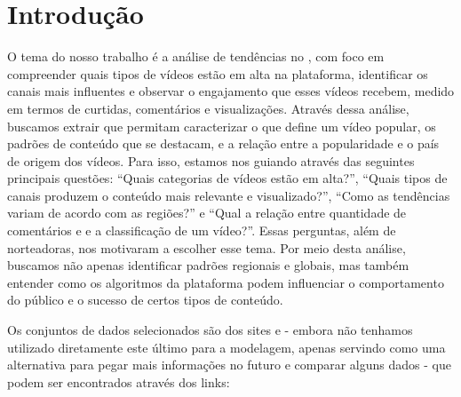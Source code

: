 
\chapter{Introdução}

  O tema do nosso trabalho é a análise de tendências no , com foco em compreender quais tipos de vídeos estão em alta na plataforma, identificar os canais mais influentes e observar o engajamento que esses vídeos recebem, medido em termos de curtidas, comentários e visualizações. Através dessa análise, buscamos extrair  que permitam caracterizar o que define um vídeo popular, os padrões de conteúdo que se destacam, e a relação entre a popularidade e o país de origem dos vídeos. Para isso, estamos nos guiando através das seguintes principais questões: ``Quais categorias de vídeos estão em alta?'', ``Quais tipos de canais produzem o conteúdo mais relevante e visualizado?'', ``Como as tendências variam de acordo com as regiões?'' e ``Qual a relação entre quantidade de comentários e  e a classificação de um vídeo?''. Essas perguntas, além de norteadoras, nos motivaram a escolher esse tema. Por meio desta análise, buscamos não apenas identificar padrões regionais e globais, mas também entender como os algoritmos da plataforma podem influenciar o comportamento do público e o sucesso de certos tipos de conteúdo.

  Os conjuntos de dados selecionados são dos sites  e  - embora não tenhamos utilizado diretamente este último para a modelagem, apenas servindo como uma alternativa para pegar mais informações no futuro e comparar alguns dados - que podem ser encontrados através dos links:

